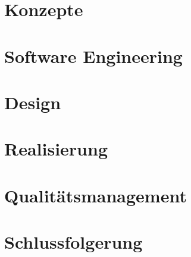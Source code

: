 \documentclass[12pt, a4paper]{report}
\begin{document}
	\chapter{Konzepte}
		
	
	
	\chapter{Software Engineering}
		
	
	\chapter{Design}
	
	
	
	
	\chapter{Realisierung}
	
	
	
	
	\chapter{Qualitätsmanagement}
	
	
	
	\chapter{Schlussfolgerung}
	
	
\end{document}
